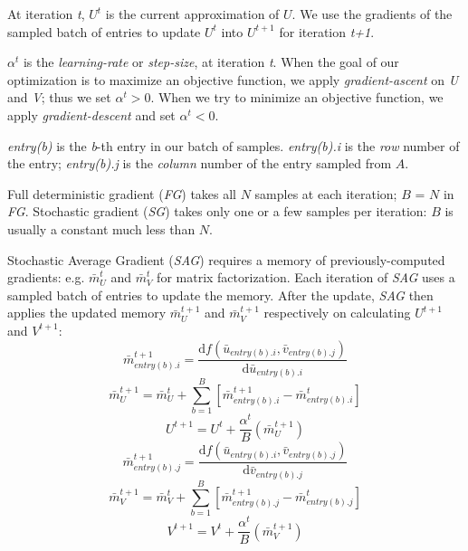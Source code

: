 At iteration \emph{t}, $U^{t}$ is the current approximation of $U$.
We use the gradients of the sampled batch of entries to update $U^{t}$ into $U^{t+1}$ for iteration \emph{t+1}.

$\alpha^{t}$ is the \emph{learning-rate} or \emph{step-size}, at iteration \emph{t}.  
When the goal of our optimization is to maximize an objective function, we apply \emph{gradient-ascent} on \emph{U} and \emph{V}; thus we set $\alpha^{t} > 0$.
When we try to minimize an objective function, we apply \emph{gradient-descent} and set $\alpha^{t} < 0$.

\emph{entry(b)} is the \emph{b}-th entry in our batch of samples.  
\emph{entry(b).i} is the \emph{row} number of the entry; \emph{entry(b).j} is the \emph{column} number of the entry sampled from $A$.

Full deterministic gradient (\emph{FG}) takes all $N$ samples at each iteration;  $B$ = $N$ in \emph{FG}.
Stochastic gradient (\emph{SG}) takes only one or a few samples per iteration: $B$ is usually a constant much less than $N$.


Stochastic Average Gradient (\emph{SAG}) requires a memory of previously-computed gradients: e.g. $\bar{m}_{U}^{t}$ and $\bar{m}_{V}^{t}$ for matrix factorization.
Each iteration of \emph{SAG} uses a sampled batch of entries to update the memory.
After the update, \emph{SAG} then applies the updated memory $\bar{m}_{U}^{t+1}$ and $\bar{m}_{V}^{t+1}$ respectively on calculating $U^{t+1}$ and $V^{t+1}$:
\begin{equation} \label{eq:sag_mi}
  \bar{m}_{entry(b).i}^{t+1} = \frac{\text{d}f(\bar{u}_{entry(b).i}, \bar{v}_{entry(b).j})}{\text{d}\bar{u}_{entry(b).i}}
\end{equation}
\begin{equation} \label{eq:sag_mu}
  \bar{m}_{U}^{t+1} = \bar{m}_{U}^{t} + \sum_{b=1}^{B}\left[\bar{m}_{entry(b).i}^{t+1} - \bar{m}_{entry(b).i}^{t}\right]
\end{equation}
\begin{equation} \label{eq:sag_ut}
  U^{t+1} = U^{t} + \frac{\alpha^{t}}{B}\left(\bar{m}_{U}^{t+1}\right)
\end{equation}
\begin{equation} \label{eq:sag_mj}
  \bar{m}_{entry(b).j}^{t+1} = \frac{\text{d}f(\bar{u}_{entry(b).i}, \bar{v}_{entry(b).j})}{\text{d}\bar{v}_{entry(b).j}}
\end{equation}
\begin{equation} \label{eq:sag_mv}
\bar{m}_{V}^{t+1} = \bar{m}_{V}^{t} + \sum_{b=1}^{B}\left[\bar{m}_{entry(b).j}^{t+1} - \bar{m}_{entry(b).j}^{t}\right]
\end{equation}
\begin{equation} \label{eq:sag_vt}
  V^{t+1} = V^{t} + \frac{\alpha^{t}}{B}\left(\bar{m}_{V}^{t+1}\right)
\end{equation}

